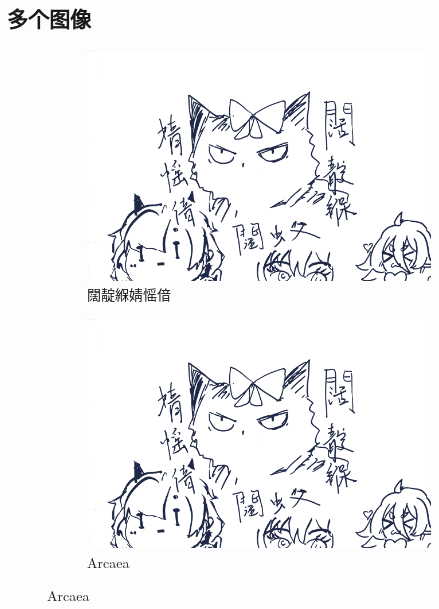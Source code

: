 \subsection{多个图像}
\begin{figure}[htbp]
    \centering
    \begin{subfigure}{.32\textwidth}
        \centering
        \includegraphics[width=\textwidth]{test.png}
        \caption{闊靛緥婧愮偣}
    \end{subfigure}
    \begin{subfigure}{.32\textwidth}
        \centering
        \includegraphics[width=\textwidth]{test.png}
        \caption{Arcaea}
    \end{subfigure}


\end{figure}
